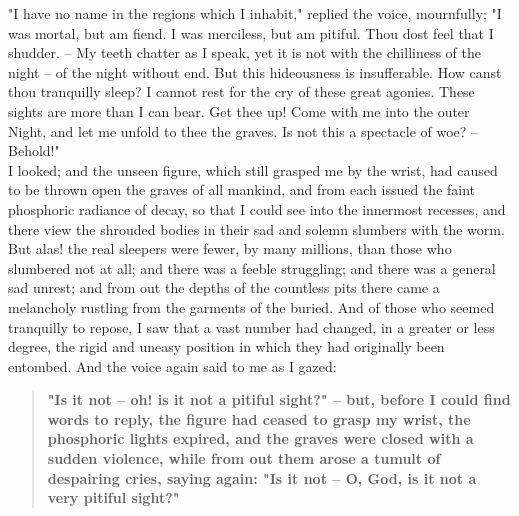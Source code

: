\documentclass[12pt,a4paper]{article}
\begin{document}
"I have no name in the regions which I inhabit," replied the voice, mournfully; "I was mortal, but am fiend. I was merciless, but am pitiful. Thou dost feel that I shudder. -- My teeth chatter as I speak, yet it is not with the chilliness of the night -- of the night without end. But this hideousness is insufferable. How canst thou tranquilly sleep? I cannot rest for the cry of these great agonies. These sights are more than I can bear. Get thee up! Come with me into the outer Night, and let me unfold to thee the graves. Is not this a spectacle of woe? -- Behold!" \\

I looked; and the unseen figure, which still grasped me by the wrist, had caused to be thrown open the graves of all mankind, and from each issued the faint phosphoric radiance of decay, so that I could see into the innermost recesses, and there view the shrouded bodies in their sad and solemn slumbers with the worm. But alas! the real sleepers were fewer, by many millions, than those who slumbered not at all; and there was a feeble struggling; and there was a general sad unrest; and from out the depths of the countless pits there came a melancholy rustling from the garments of the buried. And of those who seemed tranquilly to repose, I saw that a vast number had changed, in a greater or less degree, the rigid and uneasy position in which they had originally been entombed. And the voice again said to me as I gazed: 

\begin{quotation}
\bf
"Is it not -- oh! is it not a pitiful sight?" -- but, before I could find words to reply, the figure had ceased to grasp my wrist, the phosphoric lights expired, and the graves were closed with a sudden violence, while from out them arose a tumult of despairing cries, saying again: "Is it not -- O, God, is it not a very pitiful sight?"

\end{quotation}
\end{document}
